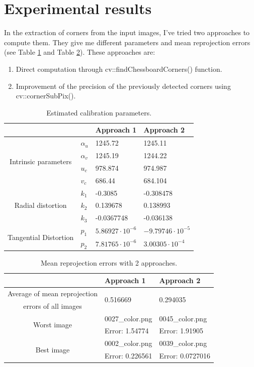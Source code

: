 \documentclass{article}
\newcommand{\e}[1]{\cdot 10^{#1}}
\begin{document}
\section{Experimental results}
In the extraction of corners from the input images, I've tried two approaches to compute them. They give me different parameters and mean reprojection errors (see Table \ref{calib} and Table \ref{mean}). These approaches are:
\begin{enumerate}
\item{Direct computation through cv::findChessboardCorners() function.}
\item{Improvement of the precision of the previously detected corners using cv::cornerSubPix().\\}
\end{enumerate}
\begin{table}[h]
\centering
\begin{tabular}{|c|l|l|l|}
\cline{3-4}
\multicolumn{1}{c}{}&\multicolumn{1}{c|}{}&{\textbf{Approach 1}}&{\textbf{Approach 2}}\\
\hline
\multirow{4}{*}{Intrinsic parameters}&{$\alpha_u$}&{1245.72}&{1245.11}\\
\cline{2-4}
&{$\alpha_v$}&{1245.19}&{1244.22}\\
\cline{2-4}
&{$u_c$}&{978.874}&{974.987}\\
\cline{2-4}
&{$v_c$}&{686.44}&{684.104}\\
\hline
\multirow{3}{*}{Radial distortion}&{$k_1$}&{-0.3085}&{-0.308478}\\
\cline{2-4}
&{$k_2$}&{0.139678}&{0.138993}\\
\cline{2-4}
&{$k_3$}&{-0.0367748}&{-0.036138}\\
\hline
\multirow{2}{*}{Tangential Distortion}&{$p_1$}&{$5.86927\e{-6}$}&{$-9.79746\e{-5}$}\\
\cline{2-4}
&{$p_2$}&{$7.81765\e{-6}$}&{$3.00305\e{-4}$}\\
\hline
\end{tabular}
\caption{Estimated calibration parameters.}\label{calib}
\end{table}
\begin{table}[h]
\centering
\begin{tabular}{|c|l|l|}
\cline{2-3}
\multicolumn{1}{c|}{}&{\textbf{Approach 1}}&{\textbf{Approach 2}}\\
\hline
{Average of mean reprojection}&\multirow{2}{*}{0.516669}&\multirow{2}{*}{0.294035}\\
{errors of all images}&&\\
\hline
\multirow{2}{*}{Worst image}&{0027\_color.png}&{0045\_color.png}\\
&{Error: 1.54774}&{Error: 1.91905}\\
\hline
\multirow{2}{*}{Best image}&{0002\_color.png}&{0039\_color.png}\\
&{Error: 0.226561}&{Error: 0.0727016}\\
\hline
\end{tabular}
\caption{Mean reprojection errors with 2 approaches.}\label{mean}
\end{table}
\end{document}

